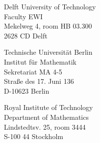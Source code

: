 
{Delft University of Technology\\
Faculty EWI\\
Mekelweg 4, room HB 03.300\\
2628 CD Delft}

\divider

{Technische Universität Berlin\\
Institut für Mathematik\\
Sekretariat MA 4-5\\
Straße des 17. Juni 136\\
D-10623 Berlin}

\divider

{Royal Institute of Technology\\
Department of Mathematics\\
Lindstedtsv. 25, room 3444\\
S-100 44 Stockholm
} 
